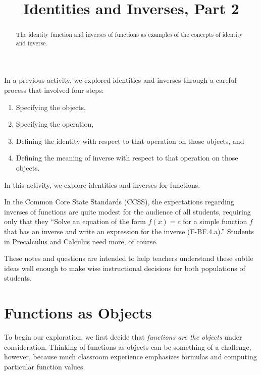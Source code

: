 \documentclass{ximera}
\title{Identities and Inverses, Part 2}
\begin{document}
\begin{abstract}
The identity function and inverses of functions as examples of the concepts of identity and inverse.    
\end{abstract}
\maketitle


%
%
In a previous activity, we explored identities and inverses through a careful process that 
involved four steps:  
\begin{enumerate}
\item Specifying the objects,
\item Specifying the operation, 
\item Defining the identity with respect to that operation on those objects, and
\item Defining the meaning of inverse with respect to that operation on those objects. 
\end{enumerate}

In this activity, we explore identities and inverses for functions.  
\begin{remark}
In the Common Core State Standards (CCSS), the expectations regarding inverses of functions are quite modest for the audience of all students, requiring only that they ``Solve an equation of the form $f(x) = c$ for a simple function $f$ that has an inverse and write an expression for the inverse (F-BF.4.a).''  Students in Precalculus and Calculus need more, of course.  

These notes and questions are intended to help teachers understand these subtle ideas well enough to make wise instructional decisions for both populations of students.   
\end{remark}

\section*{Functions as Objects}
To begin our exploration, we first decide that \emph{functions are the objects} under consideration.  Thinking of functions as objects can be something of a challenge, however, because much classroom experience  emphasizes formulas and computing particular function values. 
\end{document}
